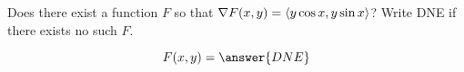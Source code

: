 \documentclass{ximera}
\author{David Guichard \and Neal Koblitz \and H. Jerome Keisler \and Albert Scheller \and Barry Balof \and Mike Wills \and Matthew Carr}
\begin{document}
\begin{exercise}




Does there exist a function $F$ so that $\nabla F(x,y)=\left\langle y\cos x,y \sin x\right\rangle$? Write DNE if there exists no such $F$. 

\begin{prompt}
\[
F(x,y)=\answer{DNE}
\]
\end{prompt}
\end{exercise}
\end{document}
